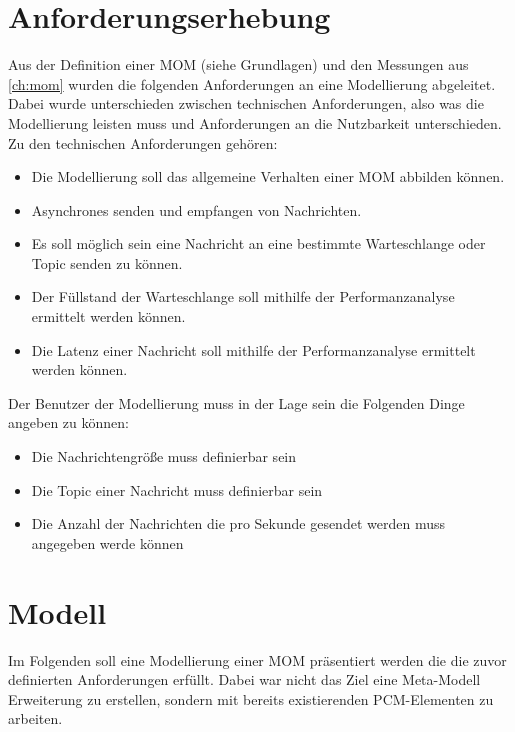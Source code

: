\section{Anforderungserhebung}
\label{sec:anforderungserhebung}
Aus der Definition einer MOM (siehe Grundlagen) und den Messungen aus \autoref{ch:mom} wurden die folgenden Anforderungen an eine Modellierung abgeleitet. Dabei wurde unterschieden zwischen technischen Anforderungen, also was die Modellierung leisten muss und Anforderungen an die Nutzbarkeit unterschieden. 
Zu den technischen Anforderungen gehören:
\begin{itemize}
    \item Die Modellierung soll das allgemeine Verhalten einer MOM abbilden können.
    \item Asynchrones senden und empfangen von Nachrichten.
    \item Es soll möglich sein eine Nachricht an eine bestimmte Warteschlange oder Topic senden zu können.
    \item Der Füllstand der Warteschlange soll mithilfe der Performanzanalyse ermittelt werden können.
    \item Die Latenz einer Nachricht soll mithilfe der Performanzanalyse ermittelt werden können.
\end{itemize}
Der Benutzer der Modellierung muss in der Lage sein die Folgenden Dinge angeben zu können:
\begin{itemize}
    \item Die Nachrichtengröße muss definierbar sein
    \item Die Topic einer Nachricht muss definierbar sein
    \item Die Anzahl der Nachrichten die pro Sekunde gesendet werden muss angegeben werde können
\end{itemize}




\section{Modell}
Im Folgenden soll eine Modellierung einer MOM präsentiert werden die die zuvor definierten Anforderungen erfüllt. Dabei war nicht das Ziel eine Meta-Modell Erweiterung zu erstellen, sondern mit bereits existierenden PCM-Elementen zu arbeiten. 

